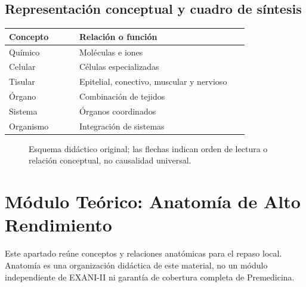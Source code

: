 \subsection{Representación conceptual y cuadro de síntesis}
\begin{longtable}{p{0.27\linewidth}p{0.65\linewidth}}
\toprule Concepto & Relación o función\\\midrule
Químico & Moléculas e iones\\
Celular & Células especializadas\\
Tisular & Epitelial, conectivo, muscular y nervioso\\
Órgano & Combinación de tejidos\\
Sistema & Órganos coordinados\\
Organismo & Integración de sistemas\\
\bottomrule
\end{longtable}
\begin{figure}[htbp]
\centering
{}
\caption{Esquema didáctico original; las flechas indican orden de lectura o relación conceptual, no causalidad universal.}
\end{figure}

\clearpage


\section{Módulo Teórico: Anatomía de Alto Rendimiento}
Este apartado reúne conceptos y relaciones anatómicas para el repaso local. Anatomía es una organización didáctica de este material, no un módulo independiente de EXANI-II ni garantía de cobertura completa de Premedicina.

